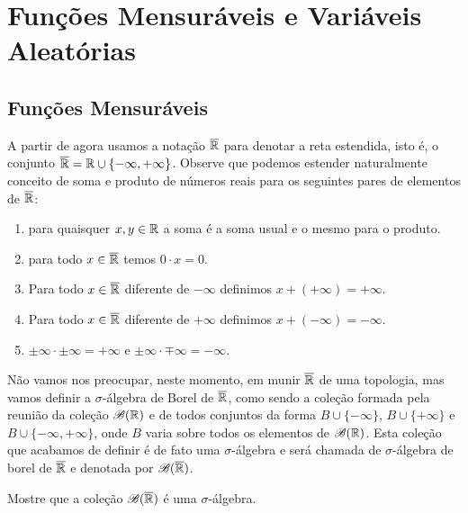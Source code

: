 \chapter[Aula 5]{Funções Mensuráveis e Variáveis Aleatórias}
\chaptermark{}

\section{Funções Mensuráveis}

A partir de agora usamos a notação $\overline{\mathbb{R}}$ 
para denotar a reta estendida, isto é, o conjunto
$\overline{\mathbb{R}} = \mathbb{R}\cup\{-\infty,+\infty\}$. 
Observe que podemos estender naturalmente conceito 
de soma e produto  de números reais
para os seguintes pares de elementos 
de $\overline{\mathbb{R}}$:
\begin{enumerate}
	\item 
	para quaisquer $x,y\in \mathbb{R}$ a soma é a soma usual 
	e o mesmo para o produto. 
	
	\item para todo $x\in \overline{\mathbb{R}}$ temos 
	$0\cdot x=0$.
	
	\item Para todo $x\in \overline{\mathbb{R}}$ diferente de 
	$-\infty$ definimos $x+(+\infty)=+\infty$.

	\item Para todo $x\in \overline{\mathbb{R}}$ diferente de 
	$+\infty$ definimos $x+(-\infty)=-\infty$.
	
	\item 
	$\pm \infty \cdot \pm \infty = +\infty$ 
	e
	$\pm \infty \cdot \mp \infty = -\infty$.
	
\end{enumerate}

Não vamos nos preocupar, neste momento, em munir $\overline{\mathbb{R}}$ 
de uma topologia, mas vamos definir a $\sigma$-álgebra
de Borel de $\overline{\mathbb{R}}$,
como sendo a coleção formada pela reunião da
coleção $\mathscr{B}(\mathbb{R})$ 
e de todos conjuntos da forma 
$B\cup\{-\infty\}$, $B\cup\{+\infty\}$ e $B\cup\{-\infty,+\infty\}$,
onde $B$ varia sobre todos os elementos de $\mathscr{B}(\mathbb{R})$.
Esta coleção que acabamos de definir
é de fato uma $\sigma$-álgebra e será chamada de $\sigma$-álgebra
de borel de $\overline{\mathbb{R}}$ e denotada por $\mathscr{B}(\overline{\mathbb{R}})$.

\begin{exercicio}
	Mostre que a coleção $\mathscr{B}(\overline{\mathbb{R}})$ 
	é uma $\sigma$-álgebra.
\end{exercicio}

